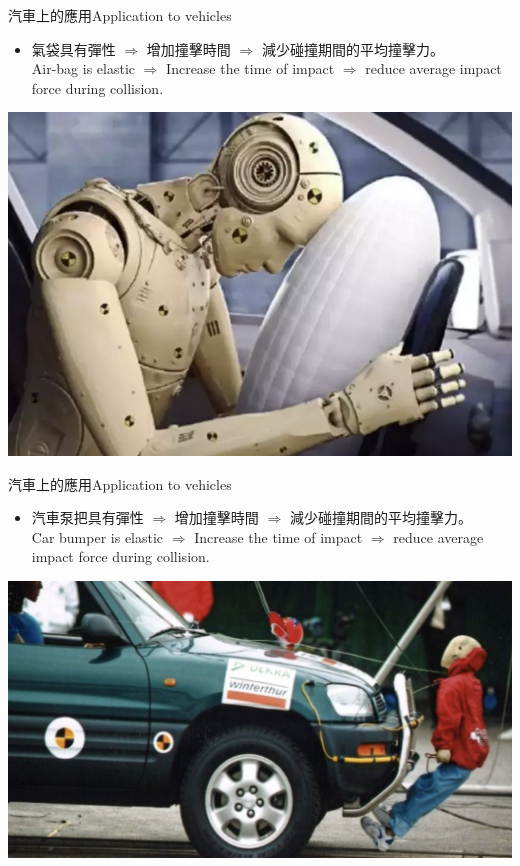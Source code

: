 \documentclass[13pt]{beamer}
\begin{document}
\begin{frame}{汽車上的應用Application to vehicles}
    \begin{itemize}
        \item 氣袋具有彈性 $\Rightarrow$ 增加撞擊時間 $\Rightarrow$ 減少碰撞期間的平均撞擊力。\\Air-bag is elastic $\Rightarrow$ Increase the time of impact  $\Rightarrow$ reduce average impact force during collision.
    \end{itemize}
    \bigskip
    {\par\centering
        \includegraphics[width=.5\textwidth]{assets/5a24494a.png}
        \par}
\end{frame}

\begin{frame}{汽車上的應用Application to vehicles}
    \begin{itemize}
        \item 汽車泵把具有彈性 $\Rightarrow$ 增加撞擊時間 $\Rightarrow$ 減少碰撞期間的平均撞擊力。\\Car bumper is elastic $\Rightarrow$ Increase the time of impact  $\Rightarrow$ reduce average impact force during collision.
    \end{itemize}\bigskip
    {\par\centering
        \includegraphics[width=.6\textwidth]{assets/b4012cdb.png}
        \par}
\end{frame}
\end{document}

